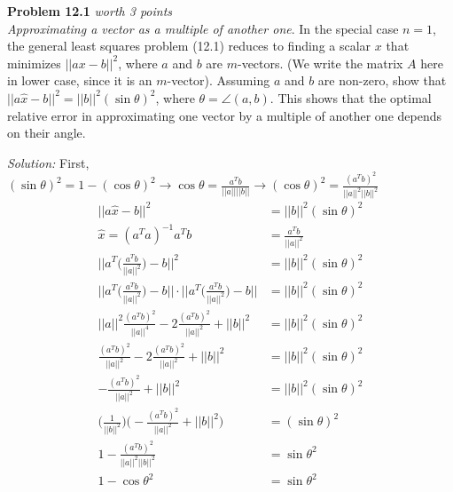 \documentclass{article}
\newenvironment{problem}[3][Problem]
    { \begin{mdframed}[backgroundcolor=gray!20] \textbf{#1 #2} \textit{worth #3 points} \\}
    {  \end{mdframed}}
\newenvironment{solution}
    {\textit{Solution:}}
    {}
\begin{document}
\begin{problem}{12.1}{3}
\textit{Approximating a vector as a multiple of another one}. In the special case $n=1$, the general least squares problem ({\color{red}12.1}) reduces to finding a scalar $x$ that minimizes $\lvert\lvert ax-b\rvert\rvert^2$, where $a$ and $b$ are $m$-vectors. (We write the matrix $A$ here in lower case, since it is an $m$-vector). Assuming $a$ and $b$ are non-zero, show that $\lvert\lvert a\hat{x}-b\rvert\rvert^2= \lvert\lvert b\rvert\rvert^2 (\sin{\theta})^2$, where $\theta=\angle(a,b).$ This shows that the optimal relative error in approximating one vector by a multiple of another one depends on their angle.
\end{problem}
\begin{solution}
First, $(\sin{\theta})^2 = 1 - (\cos{\theta})^2 \longrightarrow \cos{\theta} = \frac{a^Tb}{\lvert\lvert a\rvert\rvert\lvert\lvert b\rvert\rvert}\longrightarrow (\cos{\theta})^2 = \frac{(a^Tb)^2}{\lvert\lvert a\rvert\rvert^2\lvert\lvert b\rvert\rvert^2}$
\begin{align*}
    \lvert\lvert a\hat{x}-b\rvert\rvert^2 &= \lvert\lvert b\rvert\rvert^2 (\sin{\theta})^2 \\
    \hat{x} = (a^Ta)^{-1}a^Tb &= \frac{a^Tb}{\lvert\lvert a\rvert\rvert^2} \\
    \lvert\lvert a^T\bigg(\frac{a^Tb}{\lvert\lvert a\rvert\rvert^2}\bigg)-b\rvert\rvert^2 &= \lvert\lvert b\rvert\rvert^2 (\sin{\theta})^2\\
    \lvert\lvert a^T\bigg(\frac{a^Tb}{\lvert\lvert a\rvert\rvert^2}\bigg)-b\rvert\rvert\cdot\lvert\lvert a^T\bigg(\frac{a^Tb}{\lvert\lvert a\rvert\rvert^2}\bigg)-b\rvert\rvert &= \lvert\lvert b\rvert\rvert^2 (\sin{\theta})^2\\
    \lvert\lvert a\rvert\rvert^2 \frac{(a^Tb)^2}{\lvert\lvert a\rvert\rvert^4} - 2\frac{(a^Tb)^2}{\lvert\lvert a\rvert\rvert^2} + \lvert\lvert b\rvert\rvert^2 &= \lvert\lvert b\rvert\rvert^2 (\sin{\theta})^2\\
    \frac{(a^Tb)^2}{\lvert\lvert a\rvert\rvert^2} - 2\frac{(a^Tb)^2}{\lvert\lvert a\rvert\rvert^2} + \lvert\lvert b\rvert\rvert^2 &= \lvert\lvert b\rvert\rvert^2 (\sin{\theta})^2\\
    -\frac{(a^Tb)^2}{\lvert\lvert a\rvert\rvert^2} + \lvert\lvert b\rvert\rvert^2 &= \lvert\lvert b\rvert\rvert^2 (\sin{\theta})^2\\
    \bigg(\frac{1}{\lvert\lvert b\rvert\rvert^2}\bigg)\bigg(-\frac{(a^Tb)^2}{\lvert\lvert a\rvert\rvert^2} + \lvert\lvert b\rvert\rvert^2\bigg) &= (\sin{\theta})^2 \\
    1 - \frac{(a^Tb)^2}{\lvert\lvert a\rvert\rvert^2\lvert\lvert b\rvert\rvert^2} &= \sin{\theta}^2 \\
    1 - \cos{\theta}^2 &= \sin{\theta}^2
\end{align*}
\end{solution}
\end{document}

